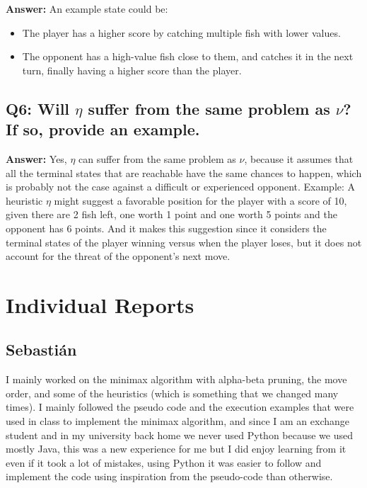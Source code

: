 \documentclass[12pt]{article}
\begin{document}
\textbf{Answer:}  
An example state could be:
\begin{itemize}
    \item The player has a higher score by catching multiple fish with lower values.
    \item The opponent has a high-value fish close to them, and catches it in the next turn, finally having a higher score than the player.
\end{itemize}

\subsection*{Q6: Will \( \eta \) suffer from the same problem as \( \nu \)? If so, provide an example.}

\textbf{Answer:}  
Yes, \( \eta \) can suffer from the same problem as \( \nu \), because it assumes that all the terminal states that are reachable have the same chances to happen, which is probably not the case against a difficult or experienced opponent.
\newline
Example: A heuristic \( \eta \) might suggest a favorable position for the player with a score of 10, given there are 2 fish left, one worth 1 point and one worth 5 points and the opponent has 6 points. And it makes this suggestion since it considers the terminal states of the player winning versus when the player loses, but it does not account for the threat of the opponent's next move.

\section{Individual Reports}

\subsection{Sebastián}
I mainly worked on the minimax algorithm with alpha-beta pruning, the move order, and some of the heuristics (which is something that we changed many times). I mainly followed the pseudo code and the execution examples that were used in class to implement the minimax algorithm, and since I am an exchange student and in my university back home we never used Python because we used mostly Java, this was a new experience for me but I did enjoy learning from it even if it took a lot of mistakes, using Python it was easier to follow and implement the code using inspiration from the pseudo-code than otherwise.
\end{document}
